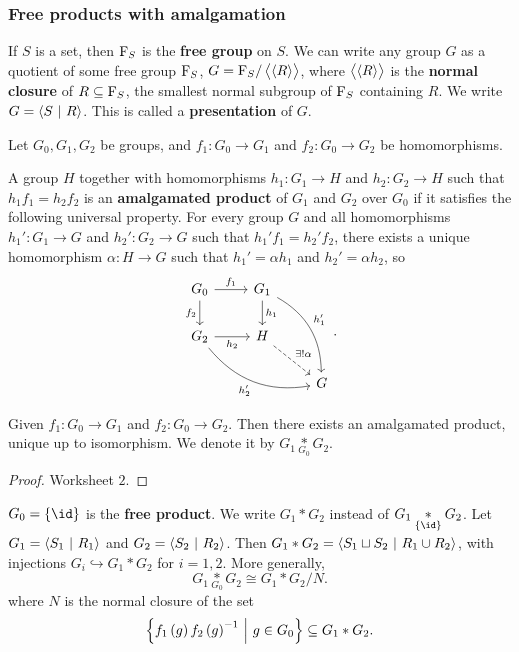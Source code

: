\subsubsection{Free products with amalgamation}

\begin{definition*}
If $ S $ is a set, then $ \mathrm{F}_S $ is the \textbf{free group} on $ S $. We can write any group $ G $ as a quotient of some free group $ \mathrm{F}_S $, $ G = \mathrm{F}_S / \left\langle \left\langle R \right\rangle \right\rangle $, where $ \left\langle \left\langle R \right\rangle \right\rangle $ is the \textbf{normal closure} of $ R \subseteq \mathrm{F}_S $, the smallest normal subgroup of $ \mathrm{F}_S $ containing $ R $. We write $ G = \left\langle S \ \middle| \  R \right\rangle $. This is called a \textbf{presentation} of $ G $.
\end{definition*}

Let $ G_0, G_1, G_2 $ be groups, and $ f_1 : G_0 \to G_1 $ and $ f_2 : G_0 \to G_2 $ be homomorphisms.

\begin{definition*}
A group $ H $ together with homomorphisms $ h_1 : G_1 \to H $ and $ h_2 : G_2 \to H $ such that $ h_1f_1 = h_2f_2 $ is an \textbf{amalgamated product} of $ G_1 $ and $ G_2 $ over $ G_0 $ if it satisfies the following universal property. For every group $ G $ and all homomorphisms $ h_1' : G_1 \to G $ and $ h_2' : G_2 \to G $ such that $ h_1'f_1 = h_2'f_2 $, there exists a unique homomorphism $ \alpha : H \to G $ such that $ h_1' = \alpha h_1 $ and $ h_2' = \alpha h_2 $, so
$$
\begin{tikzcd}
G_0 \arrow{r}{f_1} \arrow{d}[swap]{f_2} & G_1 \arrow{d}{h_1} \arrow[bend left=30]{ddr}{h_1'} & \\
G_2 \arrow{r}[swap]{h_2} \arrow[bend right=30]{drr}[swap]{h_2'} & H \arrow[dashed]{dr}{\exists !\alpha} & \\
& & G
\end{tikzcd}.
$$
\end{definition*}

\begin{theorem}
Given $ f_1 : G_0 \to G_1 $ and $ f_2 : G_0 \to G_2 $. Then there exists an amalgamated product, unique up to isomorphism. We denote it by
$ G_1 \underset{G_0}{*} G_2 $.
\end{theorem}

\begin{proof}
Worksheet $ 2 $.
\end{proof}


$ G_0 = \cbr{\id} $ is the \textbf{free product}. We write $ G_1 * G_2 $ instead of $ G_1 \underset{\cbr{\id}}{*} G_2 $. Let $ G_1 = \left\langle S_1 \ \middle| \  R_1 \right\rangle $ and $ G_2 = \left\langle S_2 \ \middle| \  R_2 \right\rangle $. Then $ G_1 * G_2 = \left\langle S_1 \sqcup S_2 \ \middle| \  R_1 \cup R_2 \right\rangle $, with injections $ G_i \hookrightarrow G_1 * G_2 $ for $ i = 1, 2 $. More generally,
$$ G_1 \underset{G_0}{*} G_2 \cong G_1 * G_2 / N. $$
where $ N $ is the normal closure of the set
$$ \cbr{f_1\br{g}f_2\br{g}^{-1} \st g \in G_0} \subseteq G_1 * G_2. $$

